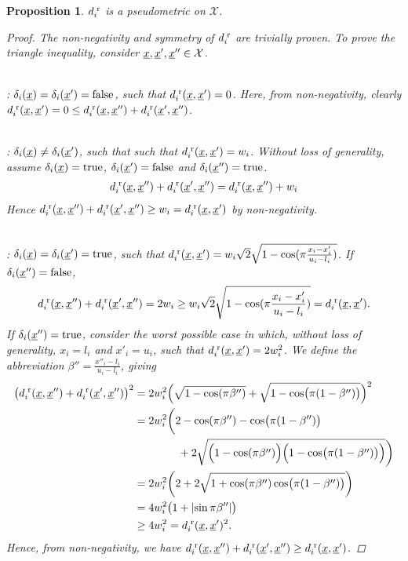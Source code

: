 \documentclass[letterpaper]{article}
\newcommand{\vect}[1]{\underline{\smash{#1}}}
\renewcommand{\v}[1]{\vect{#1}}
\newcommand{\sX}{\mathcal{X}}
\newcommand{\br}{^{\text{\textnormal{ r}}}}
\newtheorem{prop}[thm]{Proposition}
\begin{document}
\begin{prop}
  $d\br_i$ is a pseudometric on $\sX$. \label{prop:dbr_pseudometric}
\begin{proof}
The non-negativity and symmetry of $d\br_i$ are trivially proven. To prove the triangle inequality, consider $\v{x}, \v{x}', \v{x}'' \in \sX$. 

~\\: $\delta_i(\v{x}) = \delta_i(\v{x}') = \textrm{false}$, such that $d\br_i(\v{x},\v{x}') = 0$. Here, from non-negativity, clearly $d\br_i(\v{x},\v{x}') = 0 \leq d\br_i(\v{x},\v{x}'') + d\br_i(\v{x}',\v{x}'')$.

~\\: $\delta_i(\v{x}) \neq \delta_i(\v{x}')$, such that such that  $d\br_i(\v{x},\v{x}') = w_i$.  Without loss of generality, assume $\delta_i(\v{x}) = \text{true}$, $\delta_i(\v{x}') = \text{false}$ and $\delta_i(\v{x}'') = \text{true}$. 
\begin{align}
d\br_i(\v{x},\v{x}'') + d\br_i(\v{x}',\v{x}'') = d\br_i(\v{x},\v{x}'')  + w_i
\end{align}
Hence $d\br_i(\v{x},\v{x}'') + d\br_i(\v{x}',\v{x}'') \geq w_i = d\br_i(\v{x},\v{x}')$ by non-negativity.

~\\: $\delta_i(\v{x}) = \delta_i(\v{x}')=\textrm{true}$, such that  $d\br_i(\v{x},\v{x}') = w_i \sqrt{2} \sqrt{1 - \cos(\pi \frac{x_i-x_i'}{u_i-l_i})}$.  If  $\delta_i(\v{x}'') = \text{false}$,
\begin{align}
d\br_i(\v{x},\v{x}'') + d\br_i(\v{x}',\v{x}'') = 2 w_i \geq w_i \sqrt{2} \sqrt{1 - \cos(\pi \frac{x_i-x_i'}{u_i-l_i})} = d\br_i(\v{x},\v{x}').
\end{align} 
If  $\delta_i(\v{x}'') = \text{true}$, consider the worst possible case in which, without loss of generality, $x_i=l_i$ and $x'_i=u_i$, such that $d\br_i(\v{x},\v{x}')=2 w_i^2$.  We define the abbreviation $\beta'' = \frac{x''_i-l_i}{u_i-l_i}$, giving
\begin{align}
\bigl(d\br_i(\v{x},\v{x}'') + d\br_i(\v{x}',\v{x}'')\bigr)^2
& = 2w_i^2 \Bigl(\sqrt{1 - \cos (\pi \beta'')} + \sqrt{1 - \cos \bigl(\pi (1-\beta'')\bigr)}\Bigr)^2\nonumber\\
&=2w_i^2\biggl(2 - \cos (\pi \beta'') - \cos \bigl(\pi (1-\beta'')\bigr)
\nonumber\\
&\qquad\qquad+2\sqrt{\Bigl(1 - \cos (\pi \beta'')\Bigr)\Bigl(1 - \cos \bigl(\pi (1-\beta'')\bigr)\Bigr)}\biggr)\nonumber\\
&=2w_i^2\biggl(2 +2\sqrt{1 + \cos (\pi \beta'')\cos \bigl(\pi (1-\beta'')\bigr)}\biggr)\nonumber\\
&=4 w_i^2 \bigl(1 + \left|\sin \pi \beta'' \right|\bigr)\nonumber\\
&\geq 4 w_i^2 = d\br_i(\v{x},\v{x}')^2.
\end{align}
Hence, from non-negativity, we have $d\br_i(\v{x},\v{x}'') + d\br_i(\v{x}',\v{x}'')\geq d\br_i(\v{x},\v{x}')$.
\end{proof}
\end{prop}
\end{document}
